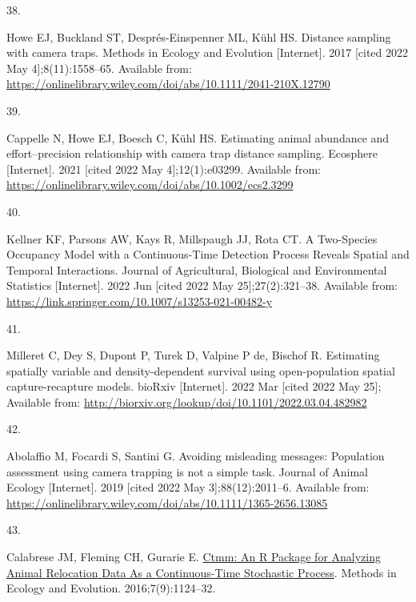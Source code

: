 \documentclass[10pt,a4paper]{article}
\newlength{\cslhangindent}
\newlength{\csllabelwidth}
\newlength{\cslentryspacingunit} %
\newenvironment{CSLReferences}[2] %
 {%
  \setlength{\parindent}{0pt}
  \ifodd #1
  \let\oldpar\par
  \def\par{\hangindent=\cslhangindent\oldpar}
  \fi
  \setlength{\parskip}{#2\cslentryspacingunit}
 }%
 {}
\newcommand{\CSLLeftMargin}[1]{\parbox[t]{\csllabelwidth}{#1}}
\newcommand{\CSLRightInline}[1]{\parbox[t]{\linewidth - \csllabelwidth}{#1}\break}
\begin{document}
\begin{CSLReferences}{0}{0}
\leavevmode{}%
\CSLLeftMargin{38. }
\CSLRightInline{Howe EJ, Buckland ST, Després-Einspenner ML, Kühl HS. Distance sampling with camera traps. Methods in Ecology and Evolution {[}Internet{]}. 2017 {[}cited 2022 May 4{]};8(11):1558--65. Available from: \url{https://onlinelibrary.wiley.com/doi/abs/10.1111/2041-210X.12790}}

\leavevmode{}%
\CSLLeftMargin{39. }
\CSLRightInline{Cappelle N, Howe EJ, Boesch C, Kühl HS. Estimating animal abundance and effort--precision relationship with camera trap distance sampling. Ecosphere {[}Internet{]}. 2021 {[}cited 2022 May 4{]};12(1):e03299. Available from: \url{https://onlinelibrary.wiley.com/doi/abs/10.1002/ecs2.3299}}

\leavevmode{}%
\CSLLeftMargin{40. }
\CSLRightInline{Kellner KF, Parsons AW, Kays R, Millspaugh JJ, Rota CT. A {Two}-{Species} {Occupancy} {Model} with a {Continuous}-{Time} {Detection} {Process} {Reveals} {Spatial} and {Temporal} {Interactions}. Journal of Agricultural, Biological and Environmental Statistics {[}Internet{]}. 2022 Jun {[}cited 2022 May 25{]};27(2):321--38. Available from: \url{https://link.springer.com/10.1007/s13253-021-00482-y}}

\leavevmode{}%
\CSLLeftMargin{41. }
\CSLRightInline{Milleret C, Dey S, Dupont P, Turek D, Valpine P de, Bischof R. Estimating spatially variable and density-dependent survival using open-population spatial capture-recapture models. bioRxiv {[}Internet{]}. 2022 Mar {[}cited 2022 May 25{]}; Available from: \url{http://biorxiv.org/lookup/doi/10.1101/2022.03.04.482982}}

\leavevmode{}%
\CSLLeftMargin{42. }
\CSLRightInline{Abolaffio M, Focardi S, Santini G. Avoiding misleading messages: {Population} assessment using camera trapping is not a simple task. Journal of Animal Ecology {[}Internet{]}. 2019 {[}cited 2022 May 3{]};88(12):2011--6. Available from: \url{https://onlinelibrary.wiley.com/doi/abs/10.1111/1365-2656.13085}}

\leavevmode{}%
\CSLLeftMargin{43. }
\CSLRightInline{Calabrese JM, Fleming CH, Gurarie E. \href{https://doi.org/10.1111/2041-210X.12559}{Ctmm: An {R} {Package} for {Analyzing} {Animal} {Relocation} {Data} {As} a {Continuous}-{Time} {Stochastic} {Process}}. Methods in Ecology and Evolution. 2016;7(9):1124--32. }


\end{CSLReferences}
\end{document}
